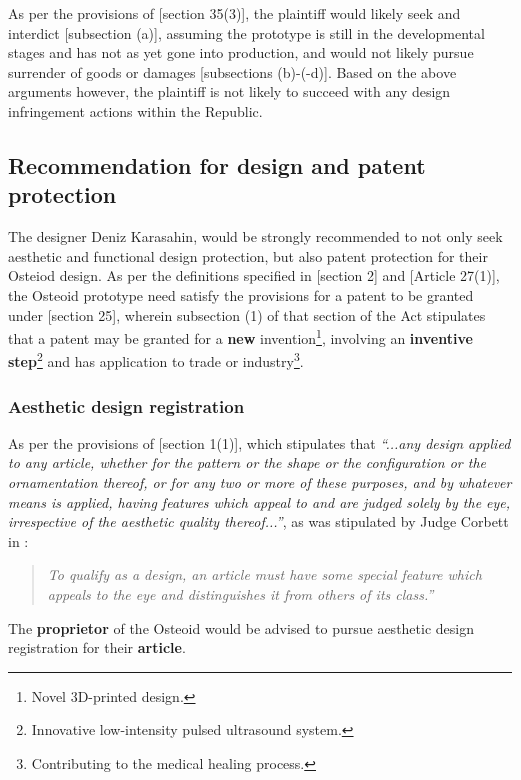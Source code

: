 \documentclass[11pt]{article}
\begin{document}
As per the provisions of [section 35(3)]\cite{rsa93_designs_act}, the plaintiff
would likely seek and interdict [subsection (a)], assuming the prototype is still in the
developmental stages and has not as yet gone into production, and would not
likely pursue surrender of goods or damages [subsections (b)-(-d)]. Based on the
above arguments however, the plaintiff is not likely to succeed with any design
infringement actions within the Republic.

\subsection{Recommendation for design and patent protection}
\label{sec:org233d204}

The designer Deniz Karasahin, would be strongly recommended to not only seek
aesthetic and functional design protection, but also patent protection for their
Osteiod design. As per the definitions specified in [section
2]\cite{rsa78_patents_act} and [Article 27(1)]\cite{wto17_trips}, the Osteoid prototype
need satisfy the provisions for a patent to be granted under [section
25]\cite{rsa78_patents_act}, wherein subsection (1) of that section of the Act
stipulates that a patent may be granted for a \textbf{new} invention\footnote{Novel 3D-printed design.\label{org509d990}}, involving
an \textbf{inventive step}\footnote{Innovative low-intensity pulsed ultrasound system.\label{orga729b9b}} and has application to trade or
industry\footnote{Contributing to the medical healing process.}.

\subsubsection{Aesthetic design registration}
\label{sec:orgff51973}
As per the provisions of [section 1(1)]\cite{rsa93_designs_act}, which stipulates
that \textit{``...any design applied to any article, whether for the
pattern or the shape or the configuration or the ornamentation thereof, or for
any two or more of these purposes, and by whatever means is applied, having
features which appeal to and are judged solely by the eye, irrespective of the
aesthetic quality thereof...''}, as was stipulated by Judge Corbett in
:
\begin{quote}
\textit{To qualify as a design, an article must have some special feature
which appeals to the eye and distinguishes it from others of its class.''}
\end{quote}
The \textbf{proprietor} of the Osteoid would be advised to pursue aesthetic design
registration for their \textbf{article}.
\end{document}
